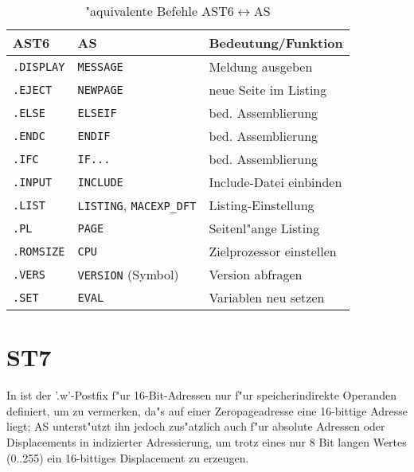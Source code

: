 \documentclass[12pt,a4paper,twoside]{report}
\newcommand{\tty}[1]{{\tt #1}}
\begin{document}
\begin{table*}[htbp]
\begin{center}\begin{tabular}{|l|l|l|}
\hline
AST6           &   AS                & Bedeutung/Funktion \\
\hline
\hline
\tty{.DISPLAY} &  \tty{MESSAGE}               & Meldung ausgeben \\
\hline
\tty{.EJECT}   &  \tty{NEWPAGE}               & neue Seite im Listing \\
\hline
\tty{.ELSE}    &  \tty{ELSEIF}                & bed. Assemblierung \\
\hline
\tty{.ENDC}    &  \tty{ENDIF}                 & bed. Assemblierung \\
\hline
\tty{.IFC}     &  \tty{IF...}                 & bed. Assemblierung \\
\hline
\tty{.INPUT}   &  \tty{INCLUDE}               & Include-Datei einbinden \\
\hline
\tty{.LIST}    &  \tty{LISTING}, \tty{MACEXP\_DFT} & Listing-Einstellung \\
\hline
\tty{.PL}      &  \tty{PAGE}                  & Seitenl"ange Listing \\
\hline
\tty{.ROMSIZE} &  \tty{CPU}                   & Zielprozessor einstellen \\
\hline
\tty{.VERS}    &  \tty{VERSION} (Symbol)      & Version abfragen \\
\hline
\tty{.SET}     &  \tty{EVAL}                  & Variablen neu setzen \\
\hline
\end{tabular}\end{center}
\caption{"aquivalente Befehle AST6$\leftrightarrow$AS\label{TabAST6}}
\end{table*}


\section{ST7}

In \cite{ST7Man} ist der '.w'-Postfix f"ur 16-Bit-Adressen nur f"ur
speicherindirekte Operanden definiert, um zu vermerken, da"s auf einer
Zeropageadresse eine 16-bittige Adresse liegt; AS unterst"utzt ihn jedoch
zus"atzlich auch f"ur absolute Adressen oder Displacements in indizierter
Adressierung, um trotz eines nur 8 Bit langen Wertes (0..255) ein
16-bittiges Displacement zu erzeugen.
\end{document}
